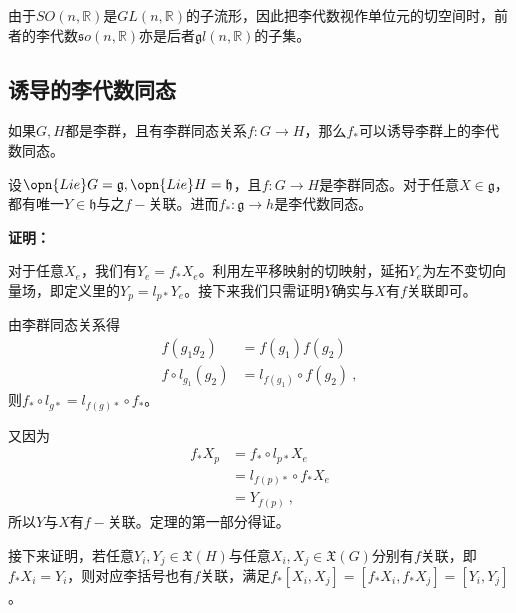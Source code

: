 由于$SO(n,\mathbb R)$是$GL(n,\mathbb R)$的子流形，因此把李代数视作单位元的切空间时，前者的李代数$\mathfrak so(n,\mathbb R)$亦是后者$\mathfrak gl(n,\mathbb R)$的子集。

\subsection{诱导的李代数同态}
如果$G,H$都是李群，且有李群同态关系$f:G\to H$，那么$f_*$可以诱导李群上的李代数同态。
\begin{theorem}{}
设$\opn{Lie}G=\mathfrak g,\opn{Lie}H=\mathfrak h$，且$f:G\to H$是李群同态。对于任意$X\in \mathfrak g$，都有唯一$Y\in \mathfrak h$与之$f-$关联。进而$f_*:\mathfrak g\to h$是李代数同态。
\end{theorem}
\textbf{证明：}

对于任意$X_e$，我们有$Y_e=f_*X_e$。利用左平移映射的切映射，延拓$Y_e$为左不变切向量场，即定义里的$Y_p=l_{p*}Y_e$。接下来我们只需证明$Y$确实与$X$有$f$关联即可。

由李群同态关系得
\begin{equation}
\begin{aligned}
f(g_1g_2)&=f(g_1)f(g_2)\\
f\circ l_{g_1}(g_2)&=l_{f(g_1)}\circ f(g_2)~,
\end{aligned}
\end{equation}
则$f_*\circ l_{g*}=l_{f(g)*}\circ f_*$。

又因为
\begin{equation}
\begin{aligned}
f_*X_p&=f_*\circ l_{p*}X_e\\
&=l_{f(p)*}\circ f_*X_e\\
&=Y_{f(p)}~,
\end{aligned}
\end{equation}
所以$Y$与$X$有$f-$关联。定理的第一部分得证。

接下来证明，若任意$Y_i,Y_j\in \mathfrak{X}(H)$与任意$X_i,X_j\in \mathfrak{X}(G)$分别有$f$关联，即$f_*X_i=Y_i$，则对应李括号也有$f$关联，满足$f_*[X_i,X_j]=[f_*X_i,f_*X_j]=[Y_i,Y_j]$。

